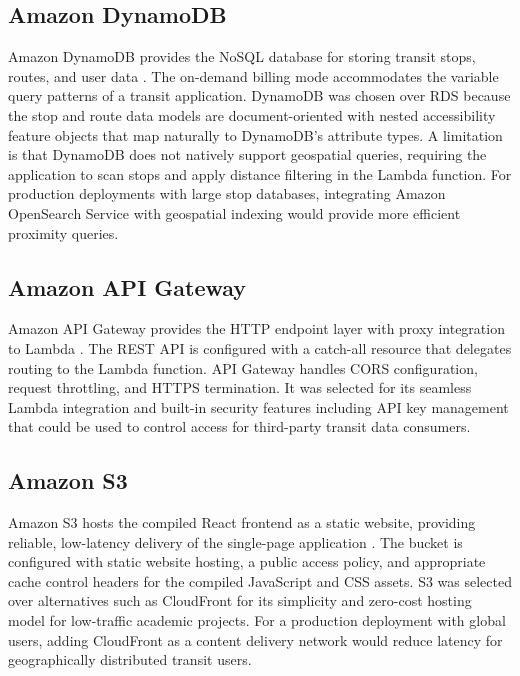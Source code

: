 \documentclass[conference]{IEEEtran}
\begin{document}
\subsection{Amazon DynamoDB}

Amazon DynamoDB provides the NoSQL database for storing transit stops, routes, and user data \cite{awsdynamodb}. The on-demand billing mode accommodates the variable query patterns of a transit application. DynamoDB was chosen over RDS because the stop and route data models are document-oriented with nested accessibility feature objects that map naturally to DynamoDB's attribute types. A limitation is that DynamoDB does not natively support geospatial queries, requiring the application to scan stops and apply distance filtering in the Lambda function. For production deployments with large stop databases, integrating Amazon OpenSearch Service with geospatial indexing would provide more efficient proximity queries.

\subsection{Amazon API Gateway}

Amazon API Gateway provides the HTTP endpoint layer with proxy integration to Lambda \cite{awsapigateway}. The REST API is configured with a catch-all resource that delegates routing to the Lambda function. API Gateway handles CORS configuration, request throttling, and HTTPS termination. It was selected for its seamless Lambda integration and built-in security features including API key management that could be used to control access for third-party transit data consumers.

\subsection{Amazon S3}

Amazon S3 hosts the compiled React frontend as a static website, providing reliable, low-latency delivery of the single-page application \cite{awss3}. The bucket is configured with static website hosting, a public access policy, and appropriate cache control headers for the compiled JavaScript and CSS assets. S3 was selected over alternatives such as CloudFront for its simplicity and zero-cost hosting model for low-traffic academic projects. For a production deployment with global users, adding CloudFront as a content delivery network would reduce latency for geographically distributed transit users.
\end{document}
